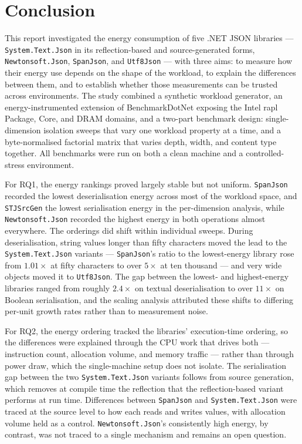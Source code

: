 \chapter{Conclusion}
\label{chap:Conclusion}

This report investigated the energy consumption of five .NET JSON libraries
--- \texttt{System.Text.Json} in its reflection-based and source-generated
forms, \texttt{Newtonsoft.Json}, \texttt{SpanJson}, and \texttt{Utf8Json} ---
with three aims: to measure how their energy use depends on the shape of the
workload, to explain the differences between them, and to establish whether
those measurements can be trusted across environments. The study combined a
synthetic workload generator, an energy-instrumented extension of
BenchmarkDotNet exposing the Intel \gls{rapl} Package, Core, and DRAM
domains, and a two-part benchmark design: single-dimension isolation sweeps
that vary one workload property at a time, and a byte-normalised factorial
matrix that varies depth, width, and content type together. All benchmarks
were run on both a clean machine and a controlled-stress environment.

For RQ1, the energy rankings proved largely stable but not uniform.
\texttt{SpanJson} recorded the lowest deserialisation energy across most of
the workload space, and \texttt{STJSrcGen} the lowest serialisation energy in
the per-dimension analysis, while \texttt{Newtonsoft.Json} recorded the
highest energy in both operations almost everywhere. The orderings did shift
within individual sweeps. During deserialisation, string values longer than
fifty characters moved the lead to the \texttt{System.Text.Json} variants ---
\texttt{SpanJson}'s ratio to the lowest-energy library rose from $1.01\times$
at fifty characters to over $5\times$ at ten thousand --- and very wide
objects moved it to \texttt{Utf8Json}. The gap between the lowest- and
highest-energy libraries ranged from roughly $2.4\times$ on textual
deserialisation to over $11\times$ on Boolean serialisation, and the scaling
analysis attributed these shifts to differing per-unit growth rates rather
than to measurement noise.

For RQ2, the energy ordering tracked the libraries' execution-time ordering,
so the differences were explained through the CPU work that drives both ---
instruction count, allocation volume, and memory traffic --- rather than
through power draw, which the single-machine setup does not isolate. The
serialisation gap between the two \texttt{System.Text.Json} variants follows
from source generation, which removes at compile time the reflection that the
reflection-based variant performs at run time. Differences between
\texttt{SpanJson} and \texttt{System.Text.Json} were traced at the source
level to how each reads and writes values, with allocation volume held as a
control. \texttt{Newtonsoft.Json}'s consistently high energy, by contrast,
was not traced to a single mechanism and remains an open question.

